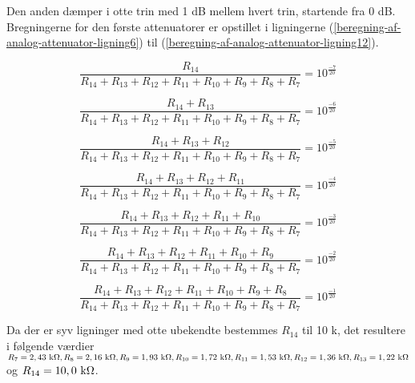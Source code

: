 Den anden dæmper i otte trin med 1 dB mellem hvert trin, startende fra 0 dB. Bregningerne for den første attenuatorer er opstillet i ligningerne (\ref{beregning-af-analog-attenuator-ligning6}) til (\ref{beregning-af-analog-attenuator-ligning12}).

\begin{equation}
\label{beregning-af-analog-attenuator-ligning6}
\frac{R_{14}}{R_{14} + R_{13} + R_{12} + R_{11} + R_{10} + R_{9} + R_{8} + R_{7}} = 10^{\frac{-7}{20}}
\end{equation}

\begin{equation}
\frac{R_{14} + R_{13}}{R_{14} + R_{13} + R_{12} + R_{11} + R_{10} + R_{9} + R_{8} + R_{7}} = 10^{\frac{-6}{20}}
\end{equation}

\begin{equation}
\frac{R_{14} + R_{13} + R_{12}}{R_{14} + R_{13} + R_{12} + R_{11} + R_{10} + R_{9} + R_{8} + R_{7}} = 10^{\frac{-5}{20}}
\end{equation}

\begin{equation}
\frac{R_{14} + R_{13} + R_{12} + R_{11}}{R_{14} + R_{13} + R_{12} + R_{11} + R_{10} + R_{9} + R_{8} + R_{7}} = 10^{\frac{-4}{20}}
\end{equation}

\begin{equation}
\frac{R_{14} + R_{13} + R_{12} + R_{11} + R_{10}}{R_{14} + R_{13} + R_{12} + R_{11} + R_{10} + R_{9} + R_{8} + R_{7}} = 10^{\frac{-3}{20}}
\end{equation}

\begin{equation}
\frac{R_{14} + R_{13} + R_{12} + R_{11} + R_{10} + R_{9}}{R_{14} + R_{13} + R_{12} + R_{11} + R_{10} + R_{9} + R_{8} + R_{7}} = 10^{\frac{-2}{20}}
\end{equation}

\begin{equation}
\label{beregning-af-analog-attenuator-ligning12}
\frac{R_{14} + R_{13} + R_{12} + R_{11} + R_{10} + R_{9} + R_{8}}{R_{14} + R_{13} + R_{12} + R_{11} + R_{10} + R_{9} + R_{8} + R_{7}} = 10^{\frac{-1}{20}}
\end{equation}

Da der er syv ligninger med otte ubekendte bestemmes $R_{14}$ til 10 k\ohm, det resultere i følgende værdier 
$R_{7} = 2,43 ~\mathrm{k}\ohm, R_{8} = 2,16 ~\mathrm{k}\ohm, R_{9} = 1,93 ~\mathrm{k}\ohm, R_{10} = 1,72 ~\mathrm{k}\ohm, R_{11} = 1,53 ~\mathrm{k}\ohm, R_{12} = 1,36 ~\mathrm{k}\ohm, R_{13} = 1,22 ~\mathrm{k}\ohm$ og $R_{14} = 10,0 ~\mathrm{k}\ohm$.